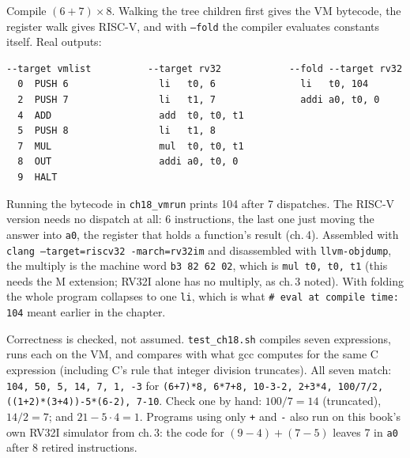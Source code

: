 



\begin{example}
Compile $(6+7)\times 8$. Walking the tree children first gives the VM
bytecode, the register walk gives RISC-V, and with \texttt{--fold}
the compiler evaluates constants itself. Real outputs:

{\scriptsize
\begin{verbatim}
--target vmlist          --target rv32            --fold --target rv32
  0  PUSH 6                li   t0, 6               li   t0, 104
  2  PUSH 7                li   t1, 7               addi a0, t0, 0
  4  ADD                   add  t0, t0, t1
  5  PUSH 8                li   t1, 8
  7  MUL                   mul  t0, t0, t1
  8  OUT                   addi a0, t0, 0
  9  HALT
\end{verbatim}
}
Running the bytecode in \texttt{ch18\_vmrun} prints 104 after 7
dispatches. The RISC-V version needs no dispatch at all: 6
instructions, the last one just moving the answer into \texttt{a0},
the register that holds a function's result (ch.\,4). Assembled with
\texttt{clang --target=riscv32 -march=rv32im} and disassembled with
\texttt{llvm-objdump}, the multiply is the machine word
\texttt{b3 82 62 02}, which is \texttt{mul t0, t0, t1} (this needs the
M extension; RV32I alone has no multiply, as ch.\,3 noted). With
folding the whole program collapses to one \texttt{li}, which is
what \texttt{\# eval at compile time: 104} meant earlier in the chapter.
\end{example}

\begin{example}
Correctness is checked, not assumed. \texttt{test\_ch18.sh} compiles
seven expressions, runs each on the VM, and compares with what gcc
computes for the same C expression (including C's rule that
integer division truncates). All seven match:
\texttt{104, 50, 5, 14, 7, 1, -3} for
\texttt{(6+7)*8, 6*7+8, 10-3-2, 2+3*4, 100/7/2, ((1+2)*(3+4))-5*(6-2), 7-10}.
Check one by hand: $100/7=14$ (truncated), $14/2=7$; and
$21-5\cdot4=1$. Programs using only \texttt{+} and \texttt{-}
also run on this book's own RV32I simulator from ch.\,3: the code for
$(9-4)+(7-5)$ leaves 7 in \texttt{a0} after 8 retired instructions.
\end{example}

